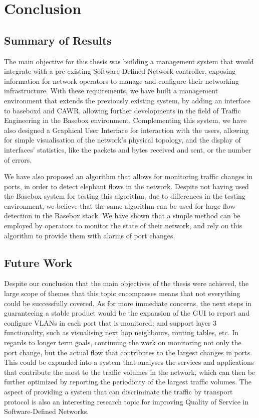 \chapter{Conclusion}

\section{Summary of Results}

The main objective for this thesis was building a management system that would integrate with a pre-existing Software-Defined Network controller, exposing information
for network operators to manage and configure their networking infrastructure. With these requirements, we have built a management environment that extends the
previously existing system, by adding an interface to baseboxd and CAWR, allowing further developments in the field of Traffic Engineering in the Basebox
environment.  Complementing this system, we have also designed a Graphical User Interface for interaction with the users, allowing for simple visualisation of the
network's physical topology, and the display of interfaces' statistics, like the packets and bytes received and sent, or the number of errors. 

\par We have also proposed an algorithm that allows for monitoring traffic changes in ports, in order to detect elephant flows in the network. Despite not having
used the Basebox system for testing this algorithm, due to differences in the testing environment, we believe that the same algorithm can be used for large flow 
detection in the Basebox stack. We have shown that a simple method can be employed by operators to monitor the state of their network, and rely on this algorithm
to provide them with alarms of port changes.

\section{Future Work}

Despite our conclusion that the main objectives of the thesis were achieved, the large scope of themes that this topic encompasses means that not everything could be 
successfully covered. As for more immediate concerns, the next steps in guaranteeing a stable product would be the expansion  of the GUI to report and configure 
VLANs in each port that is monitored; and support layer 3 functionality, such as visualising next hop neighbours, routing tables, etc. In regards to longer term
 goals, continuing the work on monitoring not only the port change, but the actual flow that contributes to the largest changes in ports. This could be expanded 
into a system that analyses the services and applications that contribute the most to the traffic volumes in the network, which can then be further optimized by 
reporting the periodicity of the largest traffic volumes. The aspect of providing a system that can discriminate the traffic by transport protocol is also an 
interesting research topic for improving Quality of Service in Software-Defined Networks.
